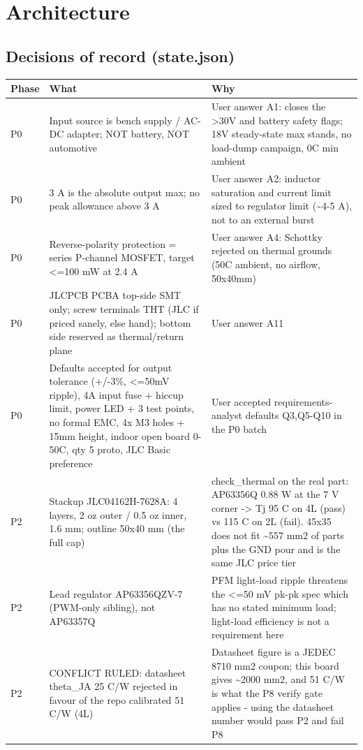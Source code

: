 \documentclass[11pt,a4paper]{article}
\begin{document}
\section{Architecture}
\subsection*{Decisions of record (state.json)}
{\small
\begin{longtable}{lp{5.2cm}p{7.2cm}}
\toprule
\textbf{Phase} & \textbf{What} & \textbf{Why} \\
\midrule
\endhead
P0 & Input source is bench supply / AC-DC adapter; NOT battery, NOT automotive & User answer A1: closes the \textgreater{}30V and battery safety flags; 18V steady-state max stands, no load-dump campaign, 0C min ambient \\
P0 & 3 A is the absolute output max; no peak allowance above 3 A & User answer A2: inductor saturation and current limit sized to regulator limit (\textasciitilde{}4-5 A), not to an external burst \\
P0 & Reverse-polarity protection = series P-channel MOSFET, target \textless{}=100 mW at 2.4 A & User answer A4: Schottky rejected on thermal grounds (50C ambient, no airflow, 50x40mm) \\
P0 & JLCPCB PCBA top-side SMT only; screw terminals THT (JLC if priced sanely, else hand); bottom side reserved as thermal/return plane & User answer A11 \\
P0 & Defaults accepted for output tolerance (+/-3\%, \textless{}=50mV ripple), 4A input fuse + hiccup limit, power LED + 3 test points, no formal EMC, 4x M3 holes + 15mm height, indoor open board 0-50C, qty 5 proto, JLC Basic preference & User accepted requirements-analyst defaults Q3,Q5-Q10 in the P0 batch \\
P2 & Stackup JLC04162H-7628A: 4 layers, 2 oz outer / 0.5 oz inner, 1.6 mm; outline 50x40 mm (the full cap) & check\_thermal on the real part: AP63356Q 0.88 W at the 7 V corner -\textgreater{} Tj 95 C on 4L (pass) vs 115 C on 2L (fail). 45x35 does not fit \textasciitilde{}557 mm2 of parts plus the GND pour and is the same JLC price tier \\
P2 & Lead regulator AP63356QZV-7 (PWM-only sibling), not AP63357Q & PFM light-load ripple threatens the \textless{}=50 mV pk-pk spec which has no stated minimum load; light-load efficiency is not a requirement here \\
P2 & CONFLICT RULED: datasheet theta\_JA 25 C/W rejected in favour of the repo calibrated 51 C/W (4L) & Datasheet figure is a JEDEC 8710 mm2 coupon; this board gives \textasciitilde{}2000 mm2, and 51 C/W is what the P8 verify gate applies - using the datasheet number would pass P2 and fail P8 \\

\end{longtable}}
\end{document}
